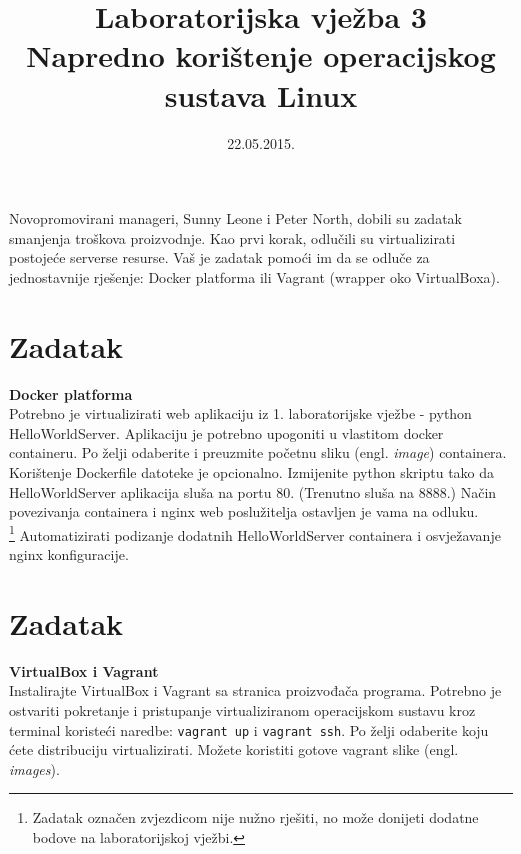 \documentclass[12pt,a4paper]{article}
\begin{document}
	\title{Laboratorijska vježba 3\\{\large Napredno korištenje operacijskog sustava Linux}}
	\date{\vspace{-5ex} 22.05.2015.}
	\maketitle
	
        Novopromovirani manageri, Sunny Leone i Peter North, dobili su zadatak smanjenja troškova proizvodnje. Kao prvi korak, odlučili su virtualizirati postojeće serverse resurse. Vaš je zadatak pomoći im da se odluče za jednostavnije rješenje: Docker platforma ili Vagrant (wrapper oko VirtualBoxa).
        
	
	\section*{Zadatak}
	
        \textbf{Docker platforma} \\
        
        Potrebno je virtualizirati web aplikaciju iz 1. laboratorijske vježbe - python HelloWorldServer. Aplikaciju je potrebno upogoniti u vlastitom docker containeru. Po želji odaberite i preuzmite početnu sliku (engl. \textit{image}) containera. Korištenje Dockerfile datoteke je opcionalno. Izmijenite python skriptu tako da HelloWorldServer aplikacija sluša na portu 80. (Trenutno sluša na 8888.) Način povezivanja containera i nginx web poslužitelja ostavljen je vama na odluku.\\
        
        \footnote[1]{Zadatak označen zvjezdicom nije nužno rješiti, no može donijeti dodatne bodove na laboratorijskoj vježbi.} Automatizirati podizanje dodatnih HelloWorldServer containera i osvježavanje nginx konfiguracije.

    \section*{Zadatak}

        \textbf{VirtualBox i Vagrant} \\

        Instalirajte VirtualBox i Vagrant sa stranica proizvođača programa. Potrebno je ostvariti pokretanje i pristupanje virtualiziranom operacijskom sustavu kroz terminal koristeći naredbe: \texttt{vagrant up} i \texttt{vagrant ssh}. Po želji odaberite koju ćete distribuciju virtualizirati. Možete koristiti gotove vagrant slike (engl. \textit{images}).
        
\end{document}
